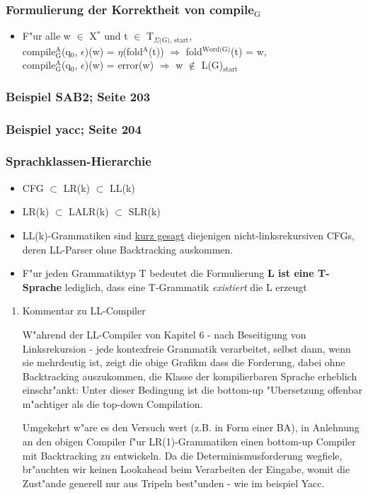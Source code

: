 \documentclass[11pt]{article}
\begin{document}
\subsubsection{Formulierung der Korrektheit von compile$_{\text{G}}$}
\label{sec-7-2-2}
\begin{itemize}
\item F"ur alle w $\in$ X$^{\text{*}}$ und t $\in$ T$_{\Sigma\text{(G), start}}$, \\ compile$_{\text{G}}^{\text{A}}$(q$_{\text{0}}$, $\epsilon$)(w) = $\eta$(fold$^{\text{A}}$(t)) $\Rightarrow$ fold$^{\text{Word(G)}}$(t) = w, \\ compile$_{\text{G}}^{\text{A}}$(q$_{\text{0}}$, $\epsilon$)(w) = error(w) $\Rightarrow$ w $\notin$ L(G)$_{\text{start}}$
\end{itemize}
\subsubsection{Beispiel SAB2; Seite 203}
\label{sec-7-2-3}

\subsubsection{Beispiel yacc; Seite 204}
\label{sec-7-2-4}

\subsubsection{Sprachklassen-Hierarchie}
\label{sec-7-2-5}

\begin{itemize}
\item CFG $\subset$ LR(k) $\subset$ LL(k)
\item LR(k) $\subset$ LALR(k) $\subset$ SLR(k)
\item LL(k)-Grammatiken sind \uline{kurz gesagt} diejenigen nicht-linksrekursiven CFGs, deren LL-Parser ohne Backtracking auskommen.
\item F"ur jeden Grammatiktyp T bedeutet die Formulierung \textbf{L ist eine T-Sprache} lediglich, dass eine T-Grammatik \emph{existiert} die L erzeugt
\end{itemize}

\begin{enumerate}
\item Kommentar zu LL-Compiler
\label{sec-7-2-5-1}

W"ahrend der LL-Compiler von Kapitel 6 - nach Beseitigung von Linksrekursion - jede kontexfreie Grammatik verarbeitet, selbst dann,
wenn sie mehrdeutig ist, zeigt die obige Grafikm dass die Forderung, dabei ohne Backtracking auszukommen, die Klasse der kompilierbaren 
Sprache erheblich einschr"ankt: Unter dieser Bedingung ist die bottom-up "Ubersetzung offenbar m"achtiger als die top-down Compilation.

Umgekehrt w"are es den Versuch wert (z.B. in Form einer BA), in Anlehnung an den obigen Compiler f"ur LR(1)-Grammatiken einen bottom-up
Compiler mit Backtracking zu entwickeln. Da die Determinismusforderung wegfiele, br"auchten wir keinen Lookahead beim Verarbeiten der 
Eingabe, womit die Zust"ande generell nur aus Tripeln best"unden - wie im beispiel Yacc.
\end{enumerate}
\end{document}
